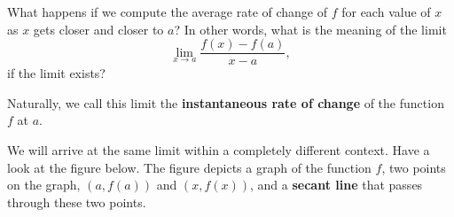 \documentclass{ximera}
\begin{document}
What happens if we compute the average rate of change of $f$  for each value of $x$ as $x$ gets closer and closer to $a$? In other words, what is the meaning of the limit
\[
     \lim_{x\to a} \frac{f(x)-f(a)}{x-a},
    \] 
    if the limit exists?
    
Naturally, we call this limit the \textbf{instantaneous rate of change} of the function $f$ at $a$.

We will arrive at the same limit within a completely different context. Have a look at the figure below.
The figure depicts a graph of the function $f$, two points on the graph, $(a,f(a))$ and $(x,f(x))$, and a \textbf{secant line} that passes  through these two points.
\begin{comment}
\begin{image}
\begin{tikzpicture}
          \begin{axis}[
            clip=false, domain=0:2.5, axis lines =middle, xlabel=$x$,
            ylabel=$y$, every axis y label/.style={at=(current
              axis.above origin),anchor=south}, 
             width=4in,
          ticks=none ]   
                             \addplot [thick, penColor,smooth] {(x-1)^2 };
      
     
                     
           \node at (axis cs:0,-0.1) {$0$};
        
           
               \addplot[only marks,very thick,penColor,mark=*]
	        coordinates{(1.65,0.43)};
	        \addplot[only marks,very thick,penColor,mark=*]
	        coordinates{(2,1)};
            
                \addplot [ thick,penColor3]  plot coordinates {(1.394,0) (2.5,1.825)};
           
	        \addplot[only marks,very thick,penColor,mark=*]
	        coordinates{(2,1)};
               
      \addplot[only marks,penColor,mark=*]
	        coordinates{(2,0)};
            \addplot[only marks,penColor,mark=*]
	        coordinates{(1.65,0)};

               \node at (axis cs:1.65,-0.1) {$a$ };
                \node at (axis cs:1.2,1.8) {slope of the secant line $=\frac{\Delta y}{\Delta x}=\frac{f(x)-f(a)}{x-a}$ };
               \node at (axis cs:2,-0.1) {$x$ };
                 \node at (axis cs:2.3,1) {$(x,f(x))$ };
                  \node at (axis cs:1.4,0.45) {$(a,f(a))$ };
                   \node at (axis cs:2.6,1.5) { secant line  };
        \end{axis}
\end{tikzpicture}
\end{image}
\end{comment}
\end{document}
